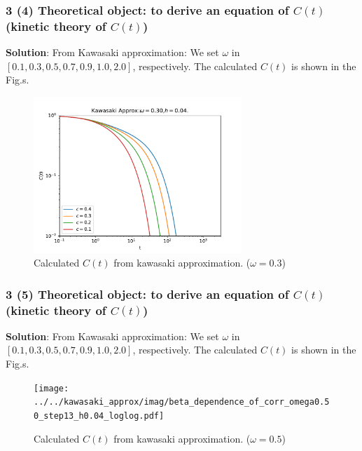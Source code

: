 \documentclass[8pt]{beamer}
\begin{document}
\begin{frame}
	\frametitle{3 (4) Theoretical object: to derive an equation of $C(t)$ (kinetic theory of $C(t)$)}
		
	{\textbf{Solution}}: From
	Kawasaki approximation:
	We set $\omega$ in  $[0.1,0.3,0.5,0.7,0.9,1.0,2.0]$, respectively.  The calculated $C(t)$ is shown in the Fig.s.
	\begin{figure}
		\centering
		\includegraphics [width=0.7\textwidth] {../../kawasaki_approx/imag/beta_dependence_of_corr_omega0.30_step13_h0.04_loglog.pdf}
		\setlength{\abovecaptionskip}{0pt}
		\caption{Calculated $C(t)$ from kawasaki approximation. ($\omega = 0.3$) }
	\end{figure}
\end{frame}
\begin{frame}
	\frametitle{3 (5) Theoretical object: to derive an equation of $C(t)$ (kinetic theory of $C(t)$)}
	
	{\textbf{Solution}}: From
	Kawasaki approximation:
	We set $\omega$ in  $[0.1,0.3,0.5,0.7,0.9,1.0,2.0]$, respectively.  The calculated $C(t)$ is shown in the Fig.s.
	\begin{figure}
		\centering
		\texttt{[image: ../../kawasaki\_approx/imag/beta\_dependence\_of\_corr\_omega0.50\_step13\_h0.04\_loglog.pdf]}
		\setlength{\abovecaptionskip}{0pt}
		\caption{Calculated $C(t)$ from kawasaki approximation. ($\omega = 0.5$) }
	\end{figure}
\end{frame}
\end{document}
